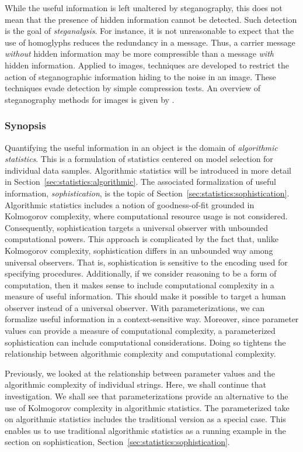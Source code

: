 While the useful information is left unaltered by steganography, this does not mean that the presence of hidden information cannot be detected.
Such detection is the goal of \emph{steganalysis}.
For instance, it is not unreasonable to expect that the use of homoglyphs reduces the redundancy in a message.
Thus, a carrier message \emph{without} hidden information may be more compressible than a message \emph{with} hidden information.
Applied to images, techniques are developed to restrict the action of steganographic information hiding to the noise in an image.
These techniques evade detection by simple compression tests.
An overview of steganography methods for images is given by \textcite{cheddad2010digital}.

\subsubsection*{Synopsis}
Quantifying the useful information in an object is the domain of \emph{algorithmic statistics}.
This is a formulation of statistics centered on model selection for individual data samples.
Algorithmic statistics will be introduced in more detail in Section~\ref{sec:statistics:algorithmic}.
The associated formalization of useful information, \emph{sophistication}, is the topic of Section~\ref{sec:statistics:sophistication}.
Algorithmic statistics includes a notion of goodness-of-fit grounded in Kolmogorov complexity, where computational resource usage is not considered.
Consequently, sophistication targets a universal observer with unbounded computational powers.
This approach is complicated by the fact that, unlike Kolmogorov complexity, sophistication differs in an unbounded way among universal observers.
That is, sophistication is sensitive to the encoding used for specifying procedures.
Additionally, if we consider reasoning to be a form of computation, then it makes sense to include computational complexity in a measure of useful information.
This should make it possible to target a human observer instead of a universal observer.
With parameterizations, we can formalize useful information in a context-sensitive way.
Moreover, since parameter values can provide a measure of computational complexity, a parameterized sophistication can include computational considerations.
Doing so tightens the relationship between algorithmic complexity and computational complexity.

Previously, we looked at the relationship between parameter values and the algorithmic complexity of individual strings.
Here, we shall continue that investigation.
We shall see that parameterizations provide an alternative to the use of Kolmogorov complexity in algorithmic statistics.
The parameterized take on algorithmic statistics includes the traditional version as a special case.
This enables us to use traditional algorithmic statistics as a running example in the section on sophistication, Section~\ref{sec:statistics:sophistication}.

